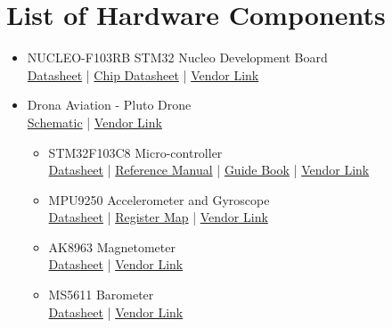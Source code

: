 \documentclass[a4paper,12pt,oneside]{book}
\begin{document}
\section{List of Hardware Components}
\begin{itemize}
\item NUCLEO-F103RB STM32 Nucleo Development Board \\
\href{./datasheets/Nucleo STM32 Board.pdf}{Datasheet} | \href{./datasheets/STM32F103X.pdf}{Chip Datasheet} | \href{http://in.element14.com/stmicroelectronics/nucleo-f103rb/nucleo-board-stm32f103rbt6-mcu/dp/2394226}{Vendor Link}

\item Drona Aviation - Pluto Drone \\
\href{./datasheets/Pluto Drone Schematic.pdf}{Schematic} | \href{http://www.dronaaviation.com/}{Vendor Link}

\begin{itemize}
\item STM32F103C8 Micro-controller\\
\href{./datasheets/STM32F103X.pdf}{Datasheet} | \href{./datasheets/STM32F1 Reference Manual.pdf}{Reference Manual} | \href{./datasheets/Geoffrey Brown - Discovering the STM32 Microcontroller.pdf}{Guide Book} | \href{http://www.amazon.in/STM32F103C8T6-Minimum-System-Development-Arduino/dp/B01EM11KOC/ref=sr_1_1?ie=UTF8&qid=1499069205&sr=8-1&keywords=STM32F103C8T6}{Vendor Link}

\item MPU9250 Accelerometer and Gyroscope \\
\href{./datasheets/MPU9250 Datasheet.pdf}{Datasheet} | \href{./datasheets/MPU9250 Register Map.pdf}{Register Map} | \href{http://www.amazon.in/Generic-MPU-9250-Communications-gyroscope-accelerometer/dp/B06XPLH7KD/ref=sr_1_2?ie=UTF8&qid=1499068377&sr=8-2&keywords=mpu9250}{Vendor Link}

\item AK8963 Magnetometer \\
\href{./datasheets/AK8963.pdf}{Datasheet} | \href{http://www.amazon.in/Generic-MPU-9250-Communications-gyroscope-accelerometer/dp/B06XPLH7KD/ref=sr_1_2?ie=UTF8&qid=1499068377&sr=8-2&keywords=mpu9250}{Vendor Link}

\item MS5611 Barometer\\
\href{./datasheets/MS5611-01BA03.pdf}{Datasheet} | \href{http://www.amazon.in/MS5611-High-Resolution-Atmospheric-Pressure-Arduino/dp/B00ZA7DMGC/ref=sr_1_3?ie=UTF8&qid=1499068488&sr=8-3&keywords=ms5611}{Vendor Link}


\end{itemize}
\end{itemize}
\end{document}
